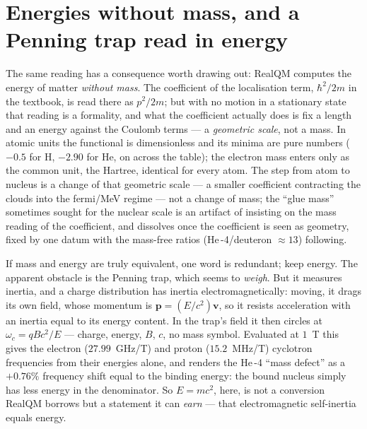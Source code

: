 \section{Energies without mass, and a Penning trap read in energy}\label{sec:no-mass}

The same reading has a consequence worth drawing out: RealQM computes the energy of matter \emph{without mass}.
The coefficient of the localisation term, $\hbar^2/2m$ in the textbook, is read there as $p^2/2m$; but with no
motion in a stationary state that reading is a formality, and what the coefficient actually does is fix a length
and an energy against the Coulomb terms --- a \emph{geometric scale}, not a mass. In atomic units the functional
is dimensionless and its minima are pure numbers ($-0.5$ for H, $-2.90$ for He, on across the table); the electron
mass enters only as the common unit, the Hartree, identical for every atom. The step from atom to nucleus is a
change of that geometric scale --- a smaller coefficient contracting the clouds into the fermi/MeV regime --- not
a change of mass; the ``glue mass'' sometimes sought for the nuclear scale is an artifact of insisting on the mass
reading of the coefficient, and dissolves once the coefficient is seen as geometry, fixed by one datum with the
mass-free ratios (He\,-4/deuteron $\approx 13$) following.

If mass and energy are truly equivalent, one word is redundant; keep energy. The apparent obstacle is the Penning
trap, which seems to \emph{weigh}. But it measures inertia, and a charge distribution has inertia
electromagnetically: moving, it drags its own field, whose momentum is $\mathbf p=(E/c^2)\mathbf v$, so it resists
acceleration with an inertia equal to its energy content. In the trap's field it then circles at
$\omega_c=qBc^2/E$ --- charge, energy, $B$, $c$, no mass symbol. Evaluated at $1$~T this gives the electron
($27.99$~GHz/T) and proton ($15.2$~MHz/T) cyclotron frequencies from their energies alone, and renders the
He\,-4 ``mass defect'' as a $+0.76\%$ frequency shift equal to the binding energy: the bound nucleus simply has
less energy in the denominator. So $E=mc^2$, here, is not a conversion RealQM borrows but a statement it can
\emph{earn} --- that electromagnetic self-inertia equals energy.

